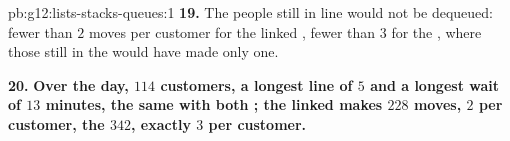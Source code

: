 \begin{solution}{pb:g12:lists-stacks-queues:1}
\textbf{19.} The people still in line would not be dequeued: fewer than $2$ moves per customer for the linked ,
fewer than $3$ for the  , where those still in the  would have made only one.

\textbf{20.} \textbf{Over the day, $114$ customers, a longest line of $5$ and a longest wait of $13$ minutes, the same
with both ; the linked  makes $228$ moves, $2$ per customer, the   $342$, exactly $3$ per
customer.}
\end{solution}
